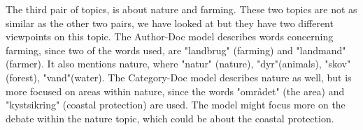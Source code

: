 The third pair of topics, is about nature and farming.
These two topics are not as similar as the other two pairs, we have looked at but they have two different viewpoints on this topic.
The Author-Doc model describes words concerning farming, since two of the words used, are "landbrug" (farming) and "landmand" (farmer). 
It also mentions nature, where "natur" (nature), "dyr"(animals), "skov"(forest), "vand"(water).
The Category-Doc model describes nature as well, but is more focused on areas within nature, since the words "området" (the area) and "kystsikring" (coastal protection) are used.
The model might focus more on the debate within the nature topic, which could be about the coastal protection.    
